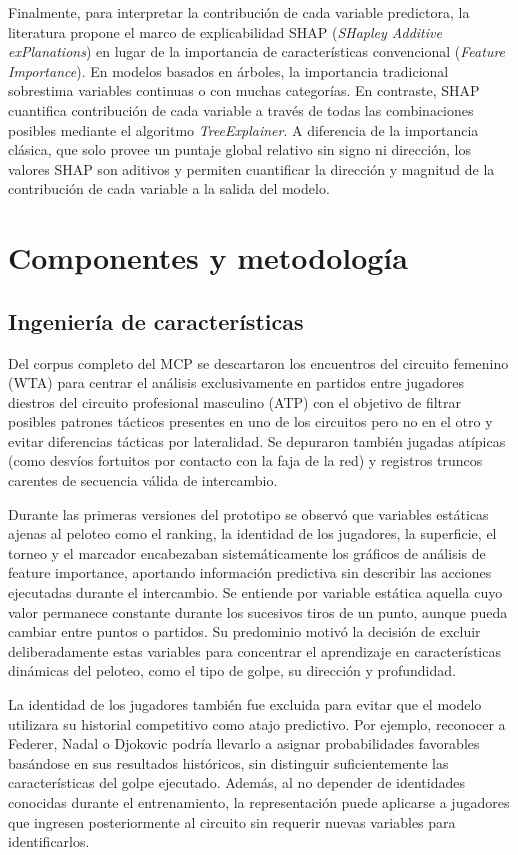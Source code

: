 \documentclass[journal]{IEEEtran}
\begin{document}
Finalmente, para interpretar la contribución de cada variable predictora, la literatura propone el marco de explicabilidad SHAP (\textit{SHapley Additive exPlanations}) \cite{lundberg2017unified} en lugar de la importancia de características convencional (\textit{Feature Importance}). En modelos basados en árboles, la importancia tradicional sobrestima variables continuas o con muchas categorías. En contraste, SHAP cuantifica contribución de cada variable a través de todas las combinaciones posibles mediante el algoritmo \textit{TreeExplainer}. A diferencia de la importancia clásica, que solo provee un puntaje global relativo sin signo ni dirección, los valores SHAP son aditivos y permiten cuantificar la dirección y magnitud de la contribución de cada variable a la salida del modelo.

\section{Componentes y metodología}
\subsection{Ingeniería de características}
Del corpus completo del MCP se descartaron los encuentros del circuito femenino (WTA) para centrar el análisis exclusivamente en partidos entre jugadores diestros del circuito profesional masculino (ATP) con el objetivo de filtrar posibles patrones tácticos presentes en uno de los circuitos pero no en el otro y evitar diferencias tácticas por lateralidad. Se depuraron también jugadas atípicas (como desvíos fortuitos por contacto con la faja de la red) y registros truncos carentes de secuencia válida de intercambio. 

Durante las primeras versiones del prototipo se observó que variables estáticas ajenas al peloteo como el ranking, la identidad de los jugadores, la superficie, el torneo y el marcador encabezaban sistemáticamente los gráficos de análisis de feature importance, aportando información predictiva sin describir las acciones ejecutadas durante el intercambio. Se entiende por variable estática aquella cuyo valor permanece constante durante los sucesivos tiros de un punto, aunque pueda cambiar entre puntos o partidos. Su predominio motivó la decisión de excluir deliberadamente estas variables para concentrar el aprendizaje en características dinámicas del peloteo, como el tipo de golpe, su dirección y profundidad.

La identidad de los jugadores también fue excluida para evitar que el modelo utilizara su historial competitivo como atajo predictivo. Por ejemplo, reconocer a Federer, Nadal o Djokovic podría llevarlo a asignar probabilidades favorables basándose en sus resultados históricos, sin distinguir suficientemente las características del golpe ejecutado. Además, al no depender de identidades conocidas durante el entrenamiento, la representación puede aplicarse a jugadores que ingresen posteriormente al circuito sin requerir nuevas variables para identificarlos.
\end{document}
